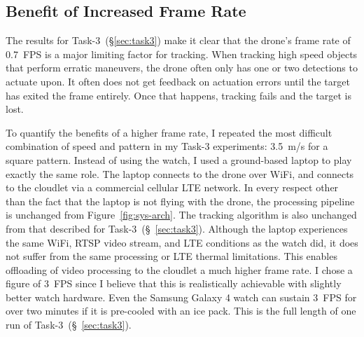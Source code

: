 \subsection{Benefit of Increased Frame Rate}
\label{sec:discussion-results}

The results for Task-3~(\S\ref{sec:task3}) make it clear that the
drone's frame rate of 0.7~FPS is a major limiting factor for tracking.
When tracking high speed objects that perform erratic maneuvers, the
drone often only has one or two detections to actuate upon. It often
does not get feedback on actuation errors until the target has exited
the frame entirely. Once that happens, tracking fails and the target
is lost.

To quantify the benefits of a higher frame rate, I repeated the most
difficult combination of speed and pattern in my Task-3 experiments:
3.5~m/s for a square pattern. Instead of using the watch, I used a
ground-based laptop to play exactly the same role.  The laptop
connects to the drone over WiFi, and connects to the cloudlet via a
commercial cellular LTE network.  In every respect other than the fact
that the laptop is not flying with the drone, the processing
pipeline is unchanged from  Figure~\ref{fig:sys-arch}.
The tracking algorithm is also unchanged from that described for
Task-3~(\S~\ref{sec:task3}). Although the laptop experiences the same
WiFi, RTSP video stream, and LTE conditions as the watch did, it does
not suffer from the same processing or LTE thermal limitations.  This
enables offloading of video processing to the cloudlet a much higher frame
rate. I chose a figure of 3~FPS since I believe that this is
realistically achievable with slightly better watch hardware. Even the
Samsung Galaxy 4 watch can sustain 3~FPS for over two minutes if it is
pre-cooled with an ice pack.  This is the full length of one run of
Task-3~(\S~\ref{sec:task3}).

